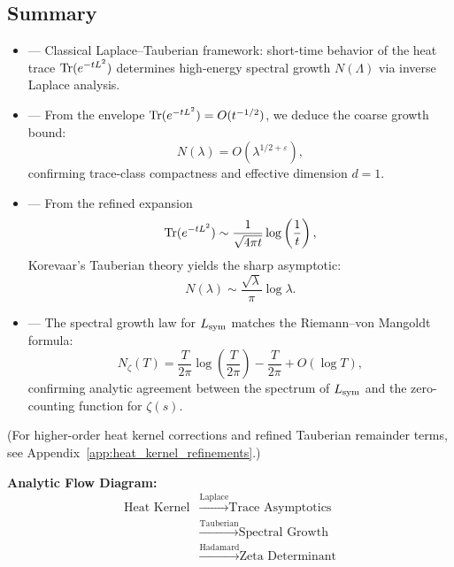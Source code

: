 \subsection*{Summary}

\begin{itemize}
  \item {} — Classical Laplace–Tauberian framework: short-time behavior of the heat trace \( \operatorname{Tr}(e^{-tL^2}) \) determines high-energy spectral growth \( N(\Lambda) \) via inverse Laplace analysis.

  \item {} — From the envelope \( \operatorname{Tr}(e^{-t L^2}) = O(t^{-1/2}) \), we deduce the coarse growth bound:
  \[
  N(\lambda) = O(\lambda^{1/2+\varepsilon}),
  \]
  confirming trace-class compactness and effective dimension \( d = 1 \).

  \item {} — From the refined expansion
  \[
  \operatorname{Tr}(e^{-t L^2}) \sim \frac{1}{\sqrt{4\pi t}} \log\left( \frac{1}{t} \right),
  \]
  Korevaar’s Tauberian theory yields the sharp asymptotic:
  \[
  N(\lambda) \sim \frac{\sqrt{\lambda}}{\pi} \log \lambda.
  \]

  \item {} — The spectral growth law for \( L_{\mathrm{sym}} \) matches the Riemann–von Mangoldt formula:
  \[
  N_\zeta(T) = \frac{T}{2\pi} \log\left( \frac{T}{2\pi} \right) - \frac{T}{2\pi} + O(\log T),
  \]
  confirming analytic agreement between the spectrum of \( L_{\mathrm{sym}} \) and the zero-counting function for \( \zeta(s) \).
\end{itemize}

\medskip
\noindent
(For higher-order heat kernel corrections and refined Tauberian remainder terms, see Appendix~\ref{app:heat_kernel_refinements}.)

\vspace{0.5em}

\noindent\textbf{Analytic Flow Diagram:}
\[
\begin{aligned}
\text{Heat Kernel}
&\xrightarrow{\text{Laplace}} \text{Trace Asymptotics} \\
&\xrightarrow{\text{Tauberian}} \text{Spectral Growth} \\
&\xrightarrow{\text{Hadamard}} \text{Zeta Determinant}
\end{aligned}
\]

